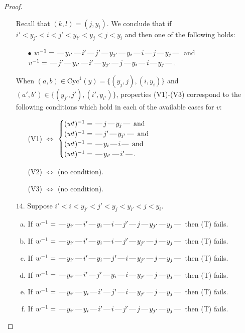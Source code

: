 \documentclass[10pt]{article}
\theoremstyle{definition}
\theoremstyle{definition}
\def\dash{\text{\hspace{0.5mm}---\hspace{0.5mm}}}
\def\Cyc{\mathrm{Cyc}}
\begin{document}
\begin{proof}
\begin{enumerate}
\begin{enumerate}[(a)]
\end{enumerate}
Recall that $(k,l) = (j,y_i)$.
We conclude that if $i' < y_{j'} < i < j' < y_{i'} < y_j < j < y_i$ and then one of the following holds:
\begin{enumerate}
\item[$\bullet$] $w^{-1} = \dash y_{i'}\dash i'\dash j'\dash y_{j'}\dash y_i\dash i\dash j\dash y_j\dash $ and $v^{-1} = \dash j'\dash y_{i'}\dash i'\dash y_{j'}\dash j\dash y_i\dash i\dash y_j\dash $.
\end{enumerate}
When $(a,b)\in\Cyc^1(y)=\{(y_j,j),(i,y_i)\}$ and $(a',b')\in\{(y_{j'},j'),(i',y_{i'})\}$,
properties (V1)-(V3) correspond to the following conditions which hold in
each of the available cases for $v$:
\begin{enumerate}
\item[](V1) $\Leftrightarrow$ $\begin{cases}\text{$(wt)^{-1} = \dash j \dash y_j \dash$}\text{ and }\\
\text{$(wt)^{-1} = \dash j' \dash y_{j'} \dash$}\text{ and }\\
\text{$(wt)^{-1} = \dash y_i \dash i \dash$}\text{ and }\\
\text{$(wt)^{-1} = \dash y_{i'} \dash i' \dash$}.\end{cases}$
\item[](V2) $\Leftrightarrow$ (no condition).
\item[](V3) $\Leftrightarrow$ (no condition).
\end{enumerate}
\item[$14$.] Suppose $i' < i < y_{j'} < j' < y_j < y_{i'} < j < y_i$.
\begin{enumerate}[(a)]
\item If $w^{-1} = \dash y_{i'}\dash i'\dash y_i\dash i\dash j'\dash j\dash y_{j'}\dash y_j\dash $ then (T) fails.
\item If $w^{-1} = \dash y_{i'}\dash i'\dash y_i\dash i\dash j'\dash y_{j'}\dash j\dash y_j\dash $ then (T) fails.
\item If $w^{-1} = \dash y_{i'}\dash i'\dash y_i\dash j'\dash i\dash y_{j'}\dash j\dash y_j\dash $ then (T) fails.
\item If $w^{-1} = \dash y_{i'}\dash i'\dash j'\dash y_i\dash i\dash y_{j'}\dash j\dash y_j\dash $ then (T) fails.
\item If $w^{-1} = \dash y_{i'}\dash y_i\dash i'\dash j'\dash i\dash y_{j'}\dash j\dash y_j\dash $ then (T) fails.
\item If $w^{-1} = \dash y_{i'}\dash y_i\dash i'\dash i\dash j'\dash j\dash y_{j'}\dash y_j\dash $ then (T) fails.

\end{enumerate}
\end{enumerate}
\end{proof}
\end{document}
